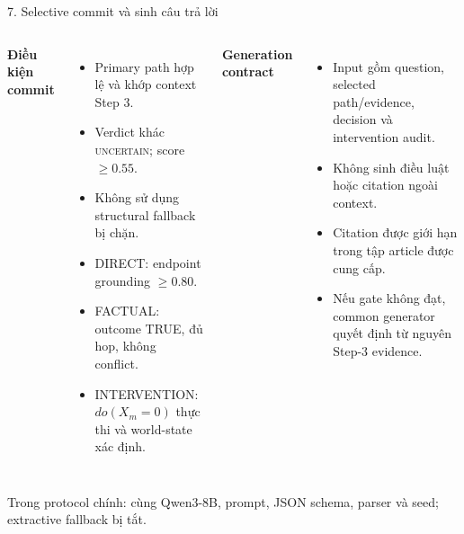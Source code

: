 \documentclass[aspectratio=169,10pt]{beamer}
\begin{document}
\begin{frame}{7. Selective commit và sinh câu trả lời}
\centering
{}

\vspace{4mm}
\begin{columns}[T,onlytextwidth]
\textbf{Điều kiện commit}
\begin{itemize}\small
  \item Primary path hợp lệ và khớp context Step 3.
  \item Verdict khác \textsc{uncertain}; score $\geq0.55$.
  \item Không sử dụng structural fallback bị chặn.
  \item DIRECT: endpoint grounding $\geq0.80$.
  \item FACTUAL: outcome TRUE, đủ hop, không conflict.
  \item INTERVENTION: $do(X_m=0)$ thực thi và world-state xác định.
\end{itemize}

\textbf{Generation contract}
\begin{itemize}\small
  \item Input gồm question, selected path/evidence, decision và intervention audit.
  \item Không sinh điều luật hoặc citation ngoài context.
  \item Citation được giới hạn trong tập article được cung cấp.
  \item Nếu gate không đạt, common generator quyết định từ nguyên Step-3 evidence.
\end{itemize}
\end{columns}

\vfill
{\scriptsize Trong protocol chính: cùng Qwen3-8B, prompt, JSON schema, parser và seed; extractive fallback bị tắt.}
\end{frame}
\end{document}
